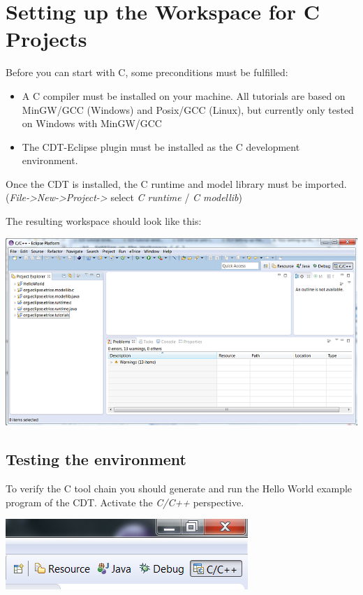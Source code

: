 \section{Setting up the Workspace for C Projects}
 
Before you can start with C, some preconditions must be fulfilled:

\begin{itemize}
\item A C compiler must be installed on your machine. All tutorials are based on MinGW/GCC (Windows) and Posix/GCC (Linux), but currently only tested on Windows with MinGW/GCC
\item The CDT-Eclipse plugin must be installed as the C development environment.
\end{itemize}

Once the CDT is installed, the C runtime and model library must be imported. 
(\textit{File->New->Project->\eTrice{}} select \textit{\eTrice{} C runtime} / \textit{\eTrice{} C modellib})

The resulting workspace should look like this:

\includegraphics{images/014-SetupWorkspaceC01.png}


\subsection{Testing the environment}

To verify the C tool chain you should generate and run the Hello World example program of the CDT. 
Activate the \textit{C/C++} perspective. 

\includegraphics{images/014-SetupWorkspaceC03.png} 
 
